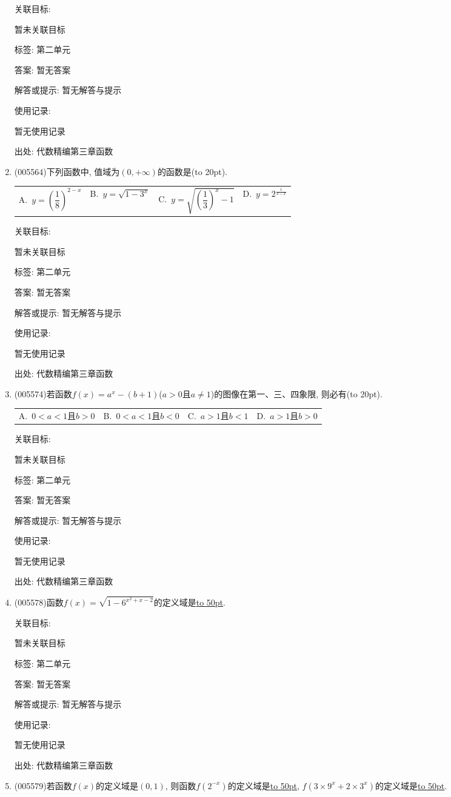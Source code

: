 \documentclass[10pt,a4paper]{article}
\newcommand{\blank}[1]{\underline{\hbox to #1pt{}}}
\newcommand{\bracket}[1]{(\hbox to #1pt{})}
\newcommand{\fourch}[4]{\par\begin{tabular}{p{.23\textwidth}p{.23\textwidth}p{.23\textwidth}p{.23\textwidth}}
A.~#1 &B.~#2& C.~#3& D.~#4
\end{tabular}}
\begin{document}
\begin{enumerate}[1.]
关联目标:

暂未关联目标



标签: 第二单元

答案: 暂无答案

解答或提示: 暂无解答与提示

使用记录:

暂无使用记录


出处: 代数精编第三章函数
\item { (005564)}下列函数中, 值域为$(0,+\infty)$的函数是\bracket{20}.
\fourch{$y=(\dfrac 18)^{2-x}$}{$y=\sqrt {1-3^x}$}{$y=\sqrt {(\dfrac 13)^x-1}$}{$y=2^{\frac 1{3-x}}$}


关联目标:

暂未关联目标



标签: 第二单元

答案: 暂无答案

解答或提示: 暂无解答与提示

使用记录:

暂无使用记录


出处: 代数精编第三章函数
\item { (005574)}若函数$f(x)=a^x-(b+1)$($a>0$且$a\ne 1$)的图像在第一、三、四象限, 则必有\bracket{20}.
\fourch{$0<a<1$且$b>0$}{$0<a<1$且$b<0$}{$a>1$且$b<1$}{$a>1$且$b>0$}


关联目标:

暂未关联目标



标签: 第二单元

答案: 暂无答案

解答或提示: 暂无解答与提示

使用记录:

暂无使用记录


出处: 代数精编第三章函数
\item { (005578)}函数$f(x)=\sqrt {1-6^{x^2+x-2}}$的定义域是\blank{50}.


关联目标:

暂未关联目标



标签: 第二单元

答案: 暂无答案

解答或提示: 暂无解答与提示

使用记录:

暂无使用记录


出处: 代数精编第三章函数
\item { (005579)}若函数$f(x)$的定义域是$(0, 1)$, 则函数$f(2^{-x})$的定义域是\blank{50}, $f(3\times 9^x+2\times 3^x)$的定义域是\blank{50}.



\end{enumerate}
\end{document}
